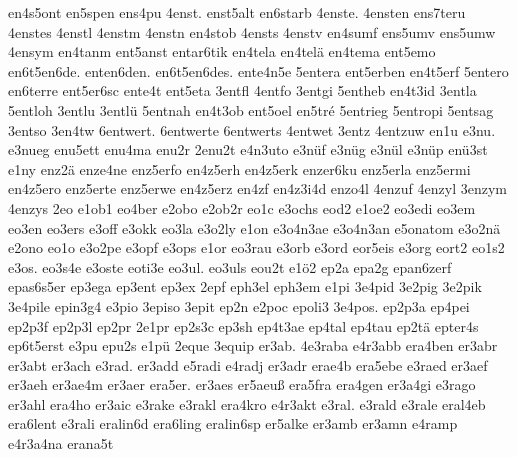 {    en4s5ont
    en5spen
    ens4pu
    4enst.
    enst5alt
    en6starb
    4enste.
    4ensten
    ens7teru
    4enstes
    4enstl
    4enstm
    4enstn
    en4stob
    4ensts
    4enstv
    en4sumf
    ens5umv
    ens5umw
    4ensym
    en4tanm
    ent5anst
    entar6tik
    en4tela
    en4telä
    en4tema
    ent5emo
    en6t5en6de.
    enten6den.
    en6t5en6des.
    ente4n5e
    5entera
    ent5erben
    en4t5erf
    5entero
    en6terre
    ent5er6sc
    ente4t
    ent5eta
    3entfl
    4entfo
    3entgi
    5entheb
    en4t3id
    3entla
    5entloh
    3entlu
    3entlü
    5entnah
    en4t3ob
    ent5oel
    en5tré
    5entrieg
    5entropi
    5entsag
    3entso
    3en4tw
    6entwert.
    6entwerte
    6entwerts
    4entwet
    3entz
    4entzuw
    en1u
    e3nu.
    e3nueg
    enu5ett
    enu4ma
    enu2r
    2enu2t
    e4n3uto
    e3nüf
    e3nüg
    e3nül
    e3nüp
    enü3st
    e1ny
    enz2ä
    enze4ne
    enz5erfo
    en4z5erh
    en4z5erk
    enzer6ku
    enz5erla
    enz5ermi
    en4z5ero
    enz5erte
    enz5erwe
    en4z5erz
    en4zf
    en4z3i4d
    enzo4l
    4enzuf
    4enzyl
    3enzym
    4enzys
    2eo
    e1ob1
    eo4ber
    e2obo
    e2ob2r
    eo1c
    e3ochs
    eod2
    e1oe2
    eo3edi
    eo3em
    eo3en
    eo3ers
    e3off
    e3okk
    eo3la
    e3o2ly
    e1on
    e3o4n3ae
    e3o4n3an
    e5onatom
    e3o2nä
    e2ono
    eo1o
    e3o2pe
    e3opf
    e3ops
    e1or
    eo3rau
    e3orb
    e3ord
    eor5eis
    e3org
    eort2
    eo1s2
    e3os.
    eo3s4e
    e3oste
    eoti3e
    eo3ul.
    eo3uls
    eou2t
    e1ö2
    ep2a
    epa2g
    epan6zerf
    epas6s5er
    ep3ega
    ep3ent
    ep3ex
    2epf
    eph3el
    eph3em
    e1pi
    3e4pid
    3e2pig
    3e2pik
    3e4pile
    epin3g4
    e3pio
    3episo
    3epit
    ep2n
    e2poc
    epoli3
    3e4pos.
    ep2p3a
    ep4pei
    ep2p3f
    ep2p3l
    ep2pr
    2e1pr
    ep2s3c
    ep3sh
    ep4t3ae
    ep4tal
    ep4tau
    ep2tä
    epter4s
    ep6t5erst
    e3pu
    epu2s
    e1pü
    2eque
    3equip
    er3ab.
    4e3raba
    e4r3abb
    era4ben
    er3abr
    er3abt
    er3ach
    e3rad.
    er3add
    e5radi
    e4radj
    er3adr
    erae4b
    era5ebe
    e3raed
    er3aef
    er3aeh
    er3ae4m
    er3aer
    era5er.
    er3aes
    er5aeuß
    era5fra
    era4gen
    er3a4gi
    e3rago
    er3ahl
    era4ho
    er3aic
    e3rake
    e3rakl
    era4kro
    e4r3akt
    e3ral.
    e3rald
    e3rale
    eral4eb
    era6lent
    e3rali
    eralin6d
    era6ling
    eralin6sp
    er5alke
    er3amb
    er3amn
    e4ramp
    e4r3a4na
    erana5t
}

